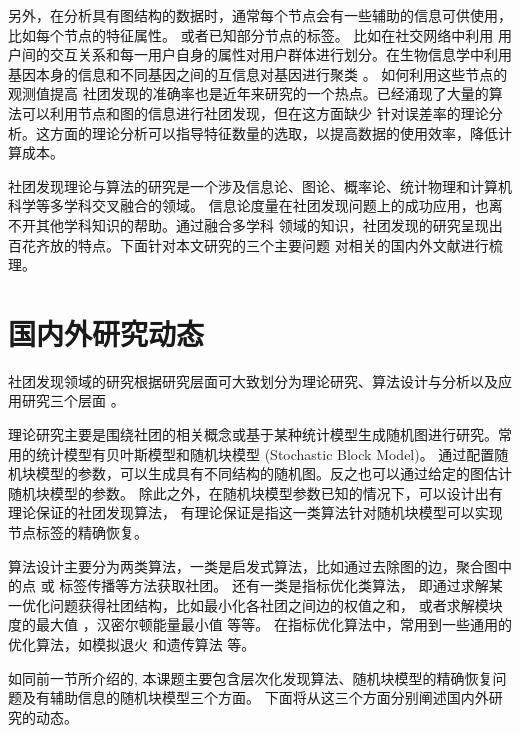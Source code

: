另外，在分析具有图结构的数据时，通常每个节点会有一些辅助的信息可供使用，比如每个节点的特征属性。
或者已知部分节点的标签。
比如在社交网络中利用
用户间的交互关系和每一用户自身的属性对用户群体进行划分。在生物信息学中利用
基因本身的信息和不同基因之间的互信息对基因进行聚类 \cite{4359897}。
如何利用这些节点的观测值提高
社团发现的准确率也是近年来研究的一个热点。已经涌现了大量的算法可以利用节点和图的信息进行社团发现，但在这方面缺少
针对误差率的理论分析。这方面的理论分析可以指导特征数量的选取，以提高数据的使用效率，降低计算成本。



社团发现理论与算法的研究是一个涉及信息论、图论、概率论、统计物理和计算机科学等多学科交叉融合的领域。
信息论度量在社团发现问题上的成功应用，也离不开其他学科知识的帮助。通过融合多学科
领域的知识，社团发现的研究呈现出百花齐放的特点。下面针对本文研究的三个主要问题
对相关的国内外文献进行梳理。

\section{国内外研究动态}

社团发现领域的研究根据研究层面可大致划分为理论研究、算法设计与分析以及应用研究三个层面
\cite{ZJSH201102017}。

理论研究主要是围绕社团的相关概念或基于某种统计模型生成随机图进行研究。常用的统计模型有贝叶斯模型和随机块模型 (Stochastic Block Model)。
通过配置随机块模型的参数，可以生成具有不同结构的随机图。反之也可以通过给定的图估计随机块模型的参数\cite{RJXB201609005}。
除此之外，在随机块模型参数已知的情况下，可以设计出有理论保证的社团发现算法，
有理论保证是指这一类算法针对随机块模型可以实现节点标签的精确恢复。

算法设计主要分为两类算法，一类是启发式算法，比如通过去除图的边\cite{girvan2002community}，聚合图中的点 \cite{clauset2004finding}或
标签传播\cite{raghavan2007near}等方法获取社团。
还有一类是指标优化类算法，
即通过求解某一优化问题获得社团结构，比如最小化各社团之间边的权值之和，
或者求解模块度的最大值 \cite{newman2006modularity}，汉密尔顿能量最小值
\cite{PhysRevLett.93.218701} 等等。
在指标优化算法中，常用到一些通用的优化算法，如模拟退火\cite{PhysRevE.71.046101}
和遗传算法 \cite{pizzuti2008ga}等。


如同前一节所介绍的, 本课题主要包含层次化发现算法、随机块模型的精确恢复问题及有辅助信息的随机块模型三个方面。
下面将从这三个方面分别阐述国内外研究的动态。
